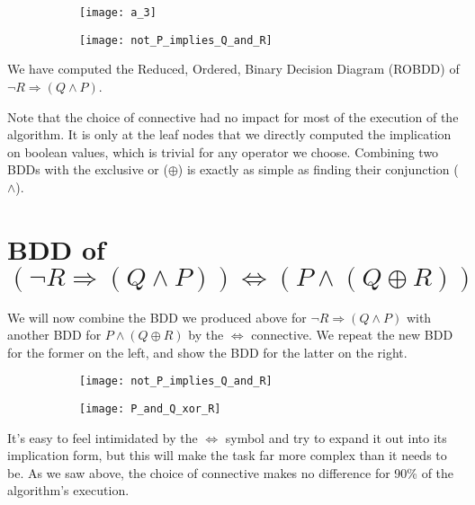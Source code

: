 \documentclass[11pt]{article}
\begin{document}
\begin{figure}[H]
  \centering
  \begin{subfigure}{0.49\textwidth}
    \centering
    \texttt{[image: a\_3]}
  \end{subfigure}
  \begin{subfigure}{0.49\textwidth}
    \centering
    \texttt{[image: not\_P\_implies\_Q\_and\_R]}
  \end{subfigure}
\end{figure}

We have computed the Reduced, Ordered, Binary Decision Diagram (ROBDD) of $\neg R \Rightarrow (Q \wedge P)$.

Note that the choice of connective had no impact for most of the execution of the algorithm. It is only at the leaf nodes that we directly computed the implication on boolean values, which is trivial for any operator we choose. Combining two BDDs with the exclusive or ($\oplus$) is exactly as simple as finding their conjunction ($\wedge$).

\pagebreak

\section{BDD of $(\neg R \Rightarrow (Q \wedge P)) \iff (P \wedge (Q \oplus R))$}

We will now combine the BDD we produced above for $\neg R \Rightarrow (Q \wedge P)$ with another BDD for $P \wedge (Q \oplus R)$ by the $\iff$ connective. We repeat the new BDD for the former on the left, and show the BDD for the latter on the right.

\begin{figure}[H]
  \centering
  \begin{subfigure}{0.49\textwidth}
    \centering
    \texttt{[image: not\_P\_implies\_Q\_and\_R]}
  \end{subfigure}
  \begin{subfigure}{0.49\textwidth}
    \centering
    \texttt{[image: P\_and\_Q\_xor\_R]}
  \end{subfigure}
\end{figure}

It's easy to feel intimidated by the $\iff$ symbol and try to expand it out into its implication form, but this will make the task far more complex than it needs to be. As we saw above, the choice of connective makes no difference for 90\% of the algorithm's execution.
\end{document}
